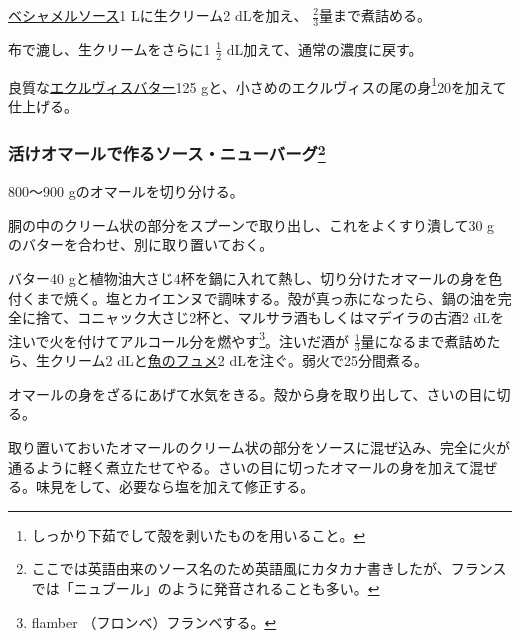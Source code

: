 \begin{recette}
\protect\hyperlink{sauce-bechamel}{ベシャメルソース}1 Lに生クリーム2
dLを加え、 \(\frac{2}{3}\)量まで煮詰める。

布で漉し、生クリームをさらに1 \(\frac{1}{2}\)
dL加えて、通常の濃度に戻す。

良質な\protect\hyperlink{beurre-d-ecrevisse}{エクルヴィスバター}125
gと、小さめのエクルヴィスの尾の身\footnote{しっかり下茹でして殻を剥いたものを用いること。}20を加えて仕上げる。

\atoaki{}

\hypertarget{sauce-new-burg-avec-le-homard-cru}{%
\subsubsection[活けオマールで作るソース・ニューバーグ]{\texorpdfstring{活けオマールで作るソース・ニューバーグ\footnote{ここでは英語由来のソース名のため英語風にカタカナ書きしたが、フランスでは「ニュブール」のように発音されることも多い。}}{活けオマールで作るソース・ニューバーグ}}\label{sauce-new-burg-avec-le-homard-cru}}



800〜900 gのオマールを切り分ける。

胴の中のクリーム状の部分をスプーンで取り出し、これをよくすり潰して30 g
のバターを合わせ、別に取り置いておく。

バター40
gと植物油大さじ4杯を鍋に入れて熱し、切り分けたオマールの身を色付くまで焼く。塩とカイエンヌで調味する。殻が真っ赤になったら、鍋の油を完全に捨て、コニャック大さじ2杯と、マルサラ酒もしくはマデイラの古酒2
dLを注いで火を付けてアルコール分を燃やす\footnote{flamber
  （フロンベ）フランベする。}。注いだ酒が
\(\frac{1}{3}\)量になるまで煮詰めたら、生クリーム2
dLと\protect\hyperlink{fumet-de-poisson}{魚のフュメ}2
dLを注ぐ。弱火で25分間煮る。

オマールの身をざるにあげて水気をきる。殻から身を取り出して、さいの目に切る。

取り置いておいたオマールのクリーム状の部分をソースに混ぜ込み、完全に火が通るように軽く煮立たせてやる。さいの目に切ったオマールの身を加えて混ぜる。味見をして、必要なら塩を加えて修正する。


\end{recette}

